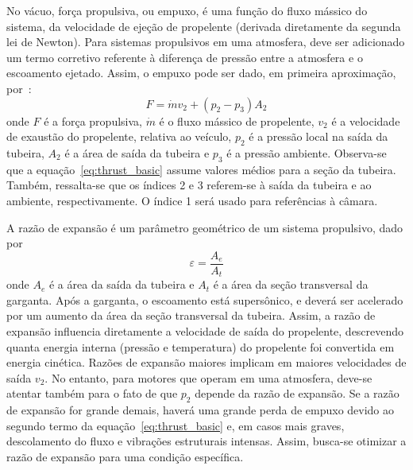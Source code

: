 No vácuo, força propulsiva, ou empuxo, é uma função do fluxo mássico do sistema, da velocidade de ejeção de propelente (derivada diretamente da segunda lei de Newton). Para sistemas propulsivos em uma atmosfera, deve ser adicionado um termo corretivo referente à diferença de pressão entre a atmosfera e o escoamento ejetado. Assim, o empuxo pode ser dado, em primeira aproximação, por~\cite{Sutton}:
\begin{equation}
    \label{eq:thrust_basic}
    F = \dot{m} v_2 + (p_2 - p_3) A_2
\end{equation}
onde \(F\) é a força propulsiva, \(\dot{m}\) é o fluxo mássico de propelente, \(v_2\) é a velocidade de exaustão do propelente, relativa ao veículo, \(p_2\) é a pressão local na saída da tubeira, \(A_2\) é a área de saída da tubeira e \(p_3\) é a pressão ambiente. Observa-se que a equação~\ref{eq:thrust_basic} assume valores médios para a seção da tubeira. Também, ressalta-se que os índices 2 e 3 referem-se à saída da tubeira e ao ambiente, respectivamente. O índice 1 será usado para referências à câmara.

A razão de expansão é um parâmetro geométrico de um sistema propulsivo, dado por
\begin{equation}
    \label{eq:exp_ratio}
    \varepsilon = \frac{A_e}{A_t}
\end{equation}
onde \(A_e\) é a área da saída da tubeira e \(A_t\) é a área da seção transversal da garganta. Após a garganta, o escoamento está supersônico, e deverá ser acelerado por um aumento da área da seção transversal da tubeira. Assim, a razão de expansão influencia diretamente a velocidade de saída do propelente, descrevendo quanta energia interna (pressão e temperatura) do propelente foi convertida em energia cinética. Razões de expansão maiores implicam em maiores velocidades de saída \(v_2\). No entanto, para motores que operam em uma atmosfera, deve-se atentar também para o fato de que \(p_2\) depende da razão de expansão. Se a razão de expansão for grande demais, haverá uma grande perda de empuxo devido ao segundo termo da equação~\ref{eq:thrust_basic} e, em casos mais graves, descolamento do fluxo e vibrações estruturais intensas. Assim, busca-se otimizar a razão de expansão para uma condição específica.

